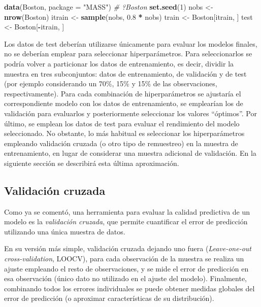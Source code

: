 \documentclass[
  spanish,
]{book}
\newenvironment{Shaded}{\begin{snugshade}}{\end{snugshade}}
\newcommand{\CommentTok}[1]{\textcolor[rgb]{0.56,0.35,0.01}{\textit{#1}}}
\newcommand{\DataTypeTok}[1]{\textcolor[rgb]{0.13,0.29,0.53}{#1}}
\newcommand{\DecValTok}[1]{\textcolor[rgb]{0.00,0.00,0.81}{#1}}
\newcommand{\FloatTok}[1]{\textcolor[rgb]{0.00,0.00,0.81}{#1}}
\newcommand{\KeywordTok}[1]{\textcolor[rgb]{0.13,0.29,0.53}{\textbf{#1}}}
\newcommand{\NormalTok}[1]{#1}
\newcommand{\OperatorTok}[1]{\textcolor[rgb]{0.81,0.36,0.00}{\textbf{#1}}}
\newcommand{\StringTok}[1]{\textcolor[rgb]{0.31,0.60,0.02}{#1}}
\theoremstyle{break}
\theoremstyle{definition}
\theoremstyle{definition}
\theoremstyle{definition}
\theoremstyle{remark}
\begin{document}
\begin{Shaded}
\begin{Highlighting}[]
\KeywordTok{data}\NormalTok{(Boston, }\DataTypeTok{package =} \StringTok{"MASS"}\NormalTok{)}
\CommentTok{# ?Boston}
\KeywordTok{set.seed}\NormalTok{(}\DecValTok{1}\NormalTok{)}
\NormalTok{nobs <-}\StringTok{ }\KeywordTok{nrow}\NormalTok{(Boston)}
\NormalTok{itrain <-}\StringTok{ }\KeywordTok{sample}\NormalTok{(nobs, }\FloatTok{0.8} \OperatorTok{*}\StringTok{ }\NormalTok{nobs)}
\NormalTok{train <-}\StringTok{ }\NormalTok{Boston[itrain, ]}
\NormalTok{test <-}\StringTok{ }\NormalTok{Boston[}\OperatorTok{-}\NormalTok{itrain, ]}
\end{Highlighting}
\end{Shaded}

Los datos de test deberían utilizarse únicamente para evaluar los modelos finales, no se deberían emplear para seleccionar hiperparámetros.
Para seleccionarlos se podría volver a particionar los datos de entrenamiento, es decir, dividir la muestra en tres subconjuntos: datos de entrenamiento, de validación y de test (por ejemplo considerando un 70\%, 15\% y 15\% de las observaciones, respectivamente).
Para cada combinación de hiperparámetros se ajustaría el correspondiente modelo con los datos de entrenamiento, se emplearían los de validación para evaluarlos y posteriormente seleccionar los valores ``óptimos''. Por último, se emplean los datos de test para evaluar el rendimiento del modelo seleccionado.
No obstante, lo más habitual es seleccionar los hiperparámetros empleando validación cruzada (o otro tipo de remuestreo) en la muestra de entrenamiento, en lugar de considerar una muestra adicional de validación.
En la siguiente sección se describirá esta última aproximación.

\hypertarget{cv}{%
\subsection{Validación cruzada}\label{cv}}

Como ya se comentó, una herramienta para evaluar la calidad predictiva de un modelo es la \emph{validación cruzada}, que permite cuantificar el error de predicción utilizando una única muestra de datos.

En su versión más simple, validación cruzada dejando uno fuera (\emph{Leave-one-out cross-validation}, LOOCV), para cada observación de la muestra se realiza un ajuste empleando el resto de observaciones, y se mide el error de predicción en esa observación (único dato no utilizado en el ajuste del modelo).
Finalmente, combinando todos los errores individuales se puede obtener medidas globales del error de predicción (o aproximar características de su distribución).
\end{document}
